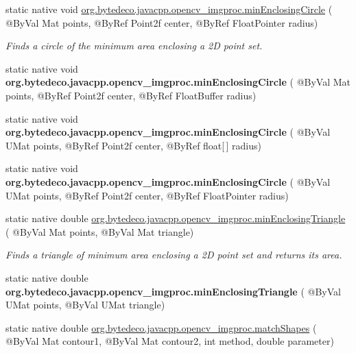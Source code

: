 \begin{DoxyCompactItemize}
static native void \hyperlink{group__imgproc__shape_ga6247e734952a578322d69260230c4a41}{org.\+bytedeco.\+javacpp.\+opencv\+\_\+imgproc.\+min\+Enclosing\+Circle} ( @By\+Val Mat points, @By\+Ref Point2f center, @By\+Ref Float\+Pointer radius)
\begin{DoxyCompactList}\small\item\em Finds a circle of the minimum area enclosing a 2D point set. \end{DoxyCompactList}\item 
\mbox{\label{group__imgproc__shape_gabdaa1e45e74a5477785134bcfa3ecab3}} 
static native void {\bfseries org.\+bytedeco.\+javacpp.\+opencv\+\_\+imgproc.\+min\+Enclosing\+Circle} ( @By\+Val Mat points, @By\+Ref Point2f center, @By\+Ref Float\+Buffer radius)
\item 
\mbox{\label{group__imgproc__shape_gab36f58950767d263b969b501edac30d8}} 
static native void {\bfseries org.\+bytedeco.\+javacpp.\+opencv\+\_\+imgproc.\+min\+Enclosing\+Circle} ( @By\+Val U\+Mat points, @By\+Ref Point2f center, @By\+Ref float\mbox{[}$\,$\mbox{]} radius)
\item 
\mbox{\label{group__imgproc__shape_ga9b12d377ced761a1de491682b6e98e8b}} 
static native void {\bfseries org.\+bytedeco.\+javacpp.\+opencv\+\_\+imgproc.\+min\+Enclosing\+Circle} ( @By\+Val U\+Mat points, @By\+Ref Point2f center, @By\+Ref Float\+Pointer radius)
\item 
static native double \hyperlink{group__imgproc__shape_ga789d0feac6b1ff1a2d13cfc58fa3e898}{org.\+bytedeco.\+javacpp.\+opencv\+\_\+imgproc.\+min\+Enclosing\+Triangle} ( @By\+Val Mat points, @By\+Val Mat triangle)
\begin{DoxyCompactList}\small\item\em Finds a triangle of minimum area enclosing a 2D point set and returns its area. \end{DoxyCompactList}\item 
\mbox{\label{group__imgproc__shape_ga632c3862bf6f37ac50afb3b2cf530d7e}} 
static native double {\bfseries org.\+bytedeco.\+javacpp.\+opencv\+\_\+imgproc.\+min\+Enclosing\+Triangle} ( @By\+Val U\+Mat points, @By\+Val U\+Mat triangle)
\item 
static native double \hyperlink{group__imgproc__shape_gad14ba9809a9703bef3dbdcd1a487d2fb}{org.\+bytedeco.\+javacpp.\+opencv\+\_\+imgproc.\+match\+Shapes} ( @By\+Val Mat contour1, @By\+Val Mat contour2, int method, double parameter)

\end{DoxyCompactItemize}

